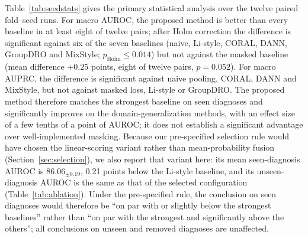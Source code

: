 Table~\ref{tab:seedstats} gives the primary statistical analysis over the twelve paired fold--seed runs. For macro AUROC, the proposed method is better than every baseline in at least eight of twelve pairs; after Holm correction the difference is significant against six of the seven baselines (naive, Li-style, CORAL, DANN, GroupDRO and MixStyle; $p_{\mathrm{Holm}}\le0.014$) but not against the masked baseline (mean difference $+0.25$ points, eight of twelve pairs, $p=0.052$). For macro AUPRC, the difference is significant against naive pooling, CORAL, DANN and MixStyle, but not against masked loss, Li-style or GroupDRO. The proposed method therefore matches the strongest baseline on seen diagnoses and significantly improves on the domain-generalization methods, with an effect size of a few tenths of a point of AUROC; it does not establish a significant advantage over well-implemented masking. Because our pre-specified selection rule would have chosen the linear-scoring variant rather than mean-probability fusion (Section~\ref{sec:selection}), we also report that variant here: its mean seen-diagnosis AUROC is $86.06_{\pm0.19}$, 0.21 points below the Li-style baseline, and its unseen-diagnosis AUROC is the same as that of the selected configuration (Table~\ref{tab:ablation}). Under the pre-specified rule, the conclusion on seen diagnoses would therefore be ``on par with or slightly below the strongest baselines'' rather than ``on par with the strongest and significantly above the others''; all conclusions on unseen and removed diagnoses are unaffected.

